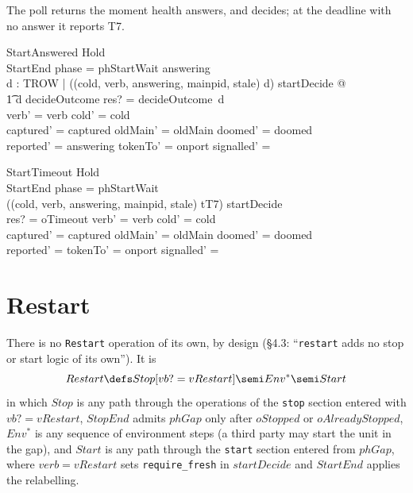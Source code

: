 \documentclass[a4paper,10pt,fleqn]{article}
\begin{document}
The poll returns the moment health answers, and decides; at the deadline with
no answer it reports T7.

\begin{schema}{StartAnswered}
  Hold \\
  StartEnd
\where
  phase = phStartWait \land answering \neq \emptyset \\
  \exists d : TROW | ((cold, verb, answering, mainpid, stale) \mapsto d)
    \in startDecide @ \\
  \t1 d \in \dom decideOutcome \land res? = decideOutcome~d \\
  verb' = verb \land cold' = cold \\
  captured' = captured \land oldMain' = oldMain \land doomed' = doomed \\
  reported' = answering \land tokenTo' = onport \land
    signalled' = \emptyset
\end{schema}

\begin{schema}{StartTimeout}
  Hold \\
  StartEnd
\where
  phase = phStartWait \\
  ((cold, verb, answering, mainpid, stale) \mapsto tT7) \in startDecide \\
  res? = oTimeout \land verb' = verb \land cold' = cold \\
  captured' = captured \land oldMain' = oldMain \land doomed' = doomed \\
  reported' = \emptyset \land tokenTo' = onport \land
    signalled' = \emptyset
\end{schema}

\section{Restart}

There is no \texttt{Restart} operation of its own, by design (\S4.3:
``\texttt{restart} adds no stop or start logic of its own''). It is
\[
  Restart \defs Stop[vb? = vRestart] \semi Env^{*} \semi Start
\]
in which $Stop$ is any path through the operations of the \texttt{stop}
section entered with $vb? = vRestart$, $StopEnd$ admits $phGap$ only after
$oStopped$ or $oAlreadyStopped$, $Env^{*}$ is any sequence of environment
steps (a third party may start the unit in the gap), and $Start$ is any path
through the \texttt{start} section entered from $phGap$, where
$verb = vRestart$ sets \texttt{require\_fresh} in $startDecide$ and
$StartEnd$ applies the relabelling.
\end{document}
